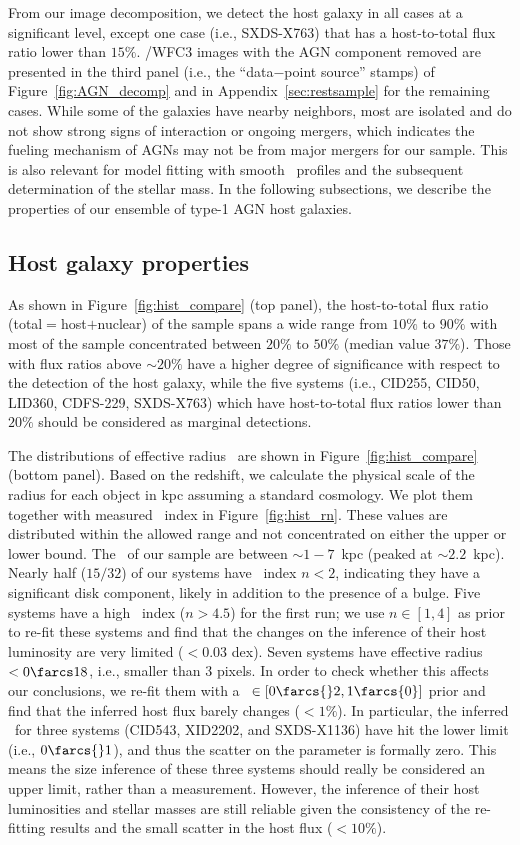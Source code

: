 \documentclass[apj]{emulateapj}
\begin{document}
From our image decomposition, we detect the host galaxy in all cases at a significant level, except one case (i.e., SXDS-X763) that has a host-to-total flux ratio lower than $15\%$. \hst/WFC3 images with the AGN component removed are presented in the third panel (i.e., the ``data$-$point source'' stamps) of Figure~\ref{fig:AGN_decomp} and in Appendix~\ref{sec:restsample} for the remaining cases. While some of the galaxies have nearby neighbors, most are isolated and do not show strong signs of interaction or ongoing mergers, which indicates the fueling mechanism of AGNs may not be from major mergers for our sample. This is also relevant for model fitting with smooth \sersic\ profiles and the subsequent determination of the stellar mass. In the following subsections, we describe the properties of our ensemble of type-1 AGN host galaxies.
 
\subsection{Host galaxy properties}
\label{sec:result-hosts}
As shown in Figure~\ref{fig:hist_compare} (top panel), the host-to-total flux ratio (total$=$host$+$nuclear) of the sample spans a wide range from $10\%$ to $90\%$ with most of the sample concentrated between $20\%$ to $50\%$ (median value $37\%$). Those with flux ratios above $\sim20\%$ have a higher degree of significance with respect to the detection of the host galaxy, while the five systems (i.e., CID255, CID50, LID360, CDFS-229, SXDS-X763) which have host-to-total flux ratios lower than $20\%$ should be considered as marginal detections. 

The distributions of effective radius \Reff\ are shown in Figure~\ref{fig:hist_compare} (bottom panel). Based on the redshift, we calculate the physical scale of the radius for each object in kpc assuming a standard cosmology. We plot them together with measured \sersic\ index in Figure~\ref{fig:hist_rn}. These values are distributed within the allowed range and not concentrated on either the upper or lower bound. The \Reff\ of our sample are between $\sim1-7$~kpc (peaked at $\sim2.2$~kpc). Nearly half ($15/32$) of our systems have \sersic\ index $n<2$, indicating they have a significant disk component, likely in addition to the presence of a bulge. Five systems have a high \sersic\ index ($n>4.5$) for the first run; we use $n\in[1,4]$ as prior to re-fit these systems and find that the changes on the inference of their host luminosity are very limited ($<0.03$ dex). 
Seven systems have effective radius \Reff$<0\farcs18$, i.e., smaller than 3 pixels. In order to check whether this affects our conclusions,  we re-fit them with a \Reff\ $\in[0\farcs{}2,1\farcs{0}]$ prior and find that the inferred host flux barely changes ($<1\%$). In particular, the
inferred \Reff\ for three systems (CID543, XID2202, and SXDS-X1136) have hit the lower limit (i.e., $0\farcs{}1$), and thus the scatter on the parameter is formally zero. This means the size inference of these three systems should really be considered an upper limit, rather than a measurement. However, the inference of their host luminosities and stellar masses are still reliable given the consistency of the re-fitting results and the small scatter in the host flux ($<10\%$).
\end{document}
